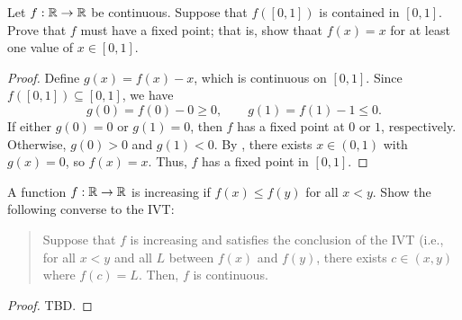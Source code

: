 \begin{problem}
  Let $f : \mathbb{R} \to \mathbb{R}$ be continuous. Suppose that $f([0, 1])$ is contained in $[0, 1]$. Prove that 
  $f$ must have a fixed point; that is, show thaat $f(x) = x$ for at least one value of $x \in [0, 1]$.

  \begin{proof}
    Define $g(x) = f(x) - x$, which is continuous on $[0,1]$.
    Since $f([0,1]) \subseteq [0,1]$, we have
    \[
      g(0) = f(0) - 0 \geq 0, \qquad g(1) = f(1) - 1 \leq 0.
    \]
    If either $g(0) = 0$ or $g(1) = 0$, then $f$ has a fixed point at $0$ or $1$, respectively.
    Otherwise, $g(0) > 0$ and $g(1) < 0$. By ,
    there exists $x \in (0,1)$ with $g(x) = 0$, so $f(x) = x$.
    Thus, $f$ has a fixed point in $[0,1]$.
  \end{proof}
\end{problem}

\begin{problem}
  A function $f : \mathbb{R} \to \mathbb{R}$ is increasing if $f(x) \leq f(y)$ for all $x < y$. Show the following converse to the IVT:

  \begin{quote}
    Suppose that $f$ is increasing and satisfies the conclusion of the IVT (i.e., for all $x < y$ and all $L$ between $f(x)$ and $f(y)$, there exists $c \in (x, y)$ where $f(c) = L$.
    Then, $f$ is continuous.
  \end{quote}

  \begin{proof}
    TBD.
  \end{proof}

\end{problem}
